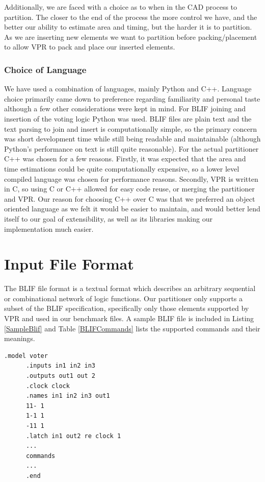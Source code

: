 \documentclass[12pt,final,oneside]{dwThesis} %
\begin{document}
   Additionally, we are faced with a choice as to when in the \gls{CAD} process
   to partition. The closer to the end of the process the more control we have,
   and the better our ability to estimate area and timing, but the harder it is
   to partition. As we are inserting new elements we want to partition before
   packing/placement to allow \gls{VPR} to pack and place our inserted
   elements.

   \subsubsection{Choice of Language} We have used a combination of languages,
   mainly Python and C++. Language choice primarily came down to preference
   regarding familiarity and personal taste although a few other considerations
   were kept in mind.  For \gls{BLIF} joining and insertion of the voting logic
   Python was used. \gls{BLIF} files are plain text and the text parsing to
   join and insert is computationally simple, so the primary concern was short
   development time while still being readable and maintainable (although
   Python's performance on text is still quite
   reasonable)\cite{LanguageBenchmark}.  For the actual partitioner C++ was
   chosen for a few reasons. Firstly, it was expected that the area and time
   estimations could be quite computationally expensive, so a lower level
   compiled language was chosen for performance
   reasons\cite{LanguageBenchmark}. Secondly, \gls{VPR} is written in C, so
   using C or C++ allowed for easy code reuse, or merging the partitioner and
   \gls{VPR}. Our reason for choosing C++ over C was that we preferred an
   object oriented language as we felt it would be easier to maintain, and
   would better lend itself to our goal of extensibility, as well as its
   libraries making our implementation much easier.


   \section{Input File Format}
   \label{secBlif} The \gls{BLIF} file format is a
   textual format which describes an arbitrary sequential or combinational
   network of logic functions\cite{BLIF}.  Our partitioner only supports a
   subset of the \gls{BLIF} specification, specifically only those elements
   supported by \gls{VPR} and used in our benchmark files.
   A sample \gls{BLIF} file is included in Listing \ref{SampleBlif} and 
   Table \ref{BLIFCommands} lists the supported commands and their meanings.
\begin{table}
   \begin{lstlisting}[caption=BLIF file layout, label=SampleBlif]
   .model voter
      .inputs in1 in2 in3
      .outputs out1 out 2
      .clock clock
      .names in1 in2 in3 out1
      11- 1
      1-1 1
      -11 1
      .latch in1 out2 re clock 1
      ...  
      commands 
      ...  
      .end
   \end{lstlisting}
\end{table}
\end{document}
